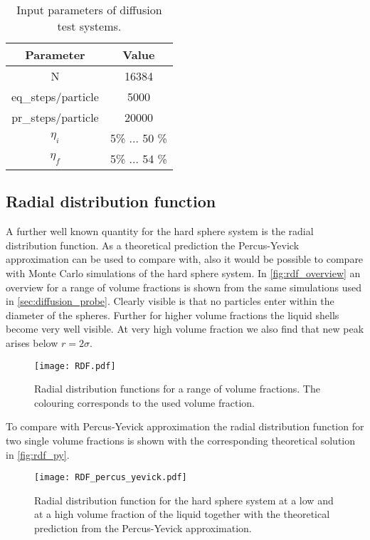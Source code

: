 \begin{table}[h]
\centering
\begin{tabular}{c|c}
Parameter & Value \\ \hline
N & 16384 \\
eq\_steps/particle & 5000 \\
pr\_steps/particle & 20000 \\
$\eta_i$ & 5\% ... 50 \% \\
$\eta_f$ & 5\% ... 54 \% \\
\end{tabular}
\caption[Simulation parameters for diffusion measurement]{Input parameters of diffusion test systems.}
\label{tab:system_diffusion}
\end{table}





\subsection{Radial distribution function}
\label{sec:RDF_prob}
A further well known quantity for the hard sphere system is the radial distribution function. As a theoretical prediction the Percus-Yevick approximation can be used to compare with, also it would be possible to compare with Monte Carlo simulations of the hard sphere system. In \autoref{fig:rdf_overview} an overview for a range of volume fractions is shown from the same simulations used in \autoref{sec:diffusion_probe}. Clearly visible is that no particles enter within the diameter of the spheres. Further for higher volume fractions the liquid shells become very well visible. At very high volume fraction we also find that  new peak arises below $r = 2 \sigma$.
\begin{figure}[h]
\centering
\texttt{[image: RDF.pdf]}
\caption[Radial distribution functions at varying volume fractions]{Radial distribution functions for a range of volume fractions. The colouring corresponds to the used volume fraction.}
\label{fig:rdf_overview}
\end{figure}

To compare with Percus-Yevick approximation the radial distribution function for two single volume fractions is shown with the corresponding theoretical solution in \autoref{fig:rdf_py}.
\begin{figure}[h]
\centering
\texttt{[image: RDF\_percus\_yevick.pdf]}
\caption[Radial distribution function with Percus-Yevick solution]{Radial distribution function for the hard sphere system at a low and at a high volume fraction of the liquid together with the theoretical prediction from the Percus-Yevick approximation.}
\label{fig:rdf_py}
\end{figure}


